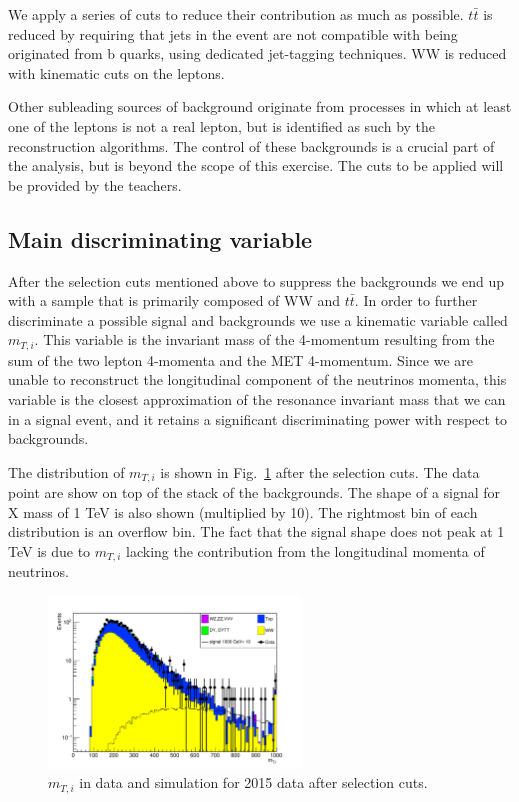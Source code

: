 \documentclass[a4paper,12pt]{article}
\begin{document}
We apply a series of cuts to reduce their contribution as much as possible.
$t\bar{t}$ is reduced by requiring that jets in the event are not compatible
with being originated from b quarks, using dedicated jet-tagging techniques.
WW is reduced with kinematic cuts on the leptons.

Other subleading sources of background originate from processes in which at
least one of the leptons is not a real lepton, but is identified as such by the
reconstruction algorithms. The control of these backgrounds is a crucial part of the analysis,
but is beyond the scope of this exercise. The cuts to be applied will be
provided by the teachers.

\subsection{Main discriminating variable}
After the selection cuts mentioned above to suppress the backgrounds we end up
with a sample that is primarily composed of WW and $t\bar{t}$. In order to
further discriminate a possible signal and backgrounds we use a kinematic
variable called $m_{T,i}$. This variable is the invariant mass of the
4-momentum resulting from the sum of the two lepton 4-momenta and the MET
4-momentum. Since we are unable to reconstruct the longitudinal component of
the neutrinos momenta, this variable is the closest approximation of
the resonance invariant mass that we can in a signal event, and it retains a
significant discriminating power with respect to backgrounds.

The distribution of  $m_{T,i}$ is shown in Fig.~\ref{fig:mti} after the
selection cuts. The data point are show on top of the stack of the
backgrounds. The shape of a signal for X mass of 1 TeV is also shown
(multiplied by 10). The rightmost bin of each distribution is an overflow bin.
The fact that the signal shape does not peak at 1 TeV is due to 
$m_{T,i}$ lacking the contribution from the longitudinal  momenta of neutrinos.
\begin{figure}[!b]
\centering
\includegraphics[width=0.6\textwidth]{images/mTi.pdf}
\caption{$m_{T,i}$ in data and simulation for 2015 data after selection cuts.\label{fig:mti}}
\end{figure}
\end{document}
